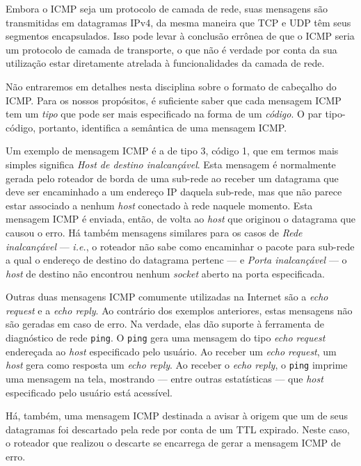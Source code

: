 \documentclass{article}
\begin{document}
Embora o ICMP seja um protocolo de camada de rede, suas mensagens são transmitidas em datagramas IPv4, da mesma maneira que TCP e UDP têm seus segmentos encapsulados. Isso pode levar à conclusão errônea de que o ICMP seria um protocolo de camada de transporte, o que não é verdade por conta da sua utilização estar diretamente atrelada à funcionalidades da camada de rede.

Não entraremos em detalhes nesta disciplina sobre o formato de cabeçalho do ICMP. Para os nossos propósitos, é suficiente saber que cada mensagem ICMP tem um \textit{tipo} que pode ser mais especificado na forma de um \textit{código}. O par tipo-código, portanto, identifica a semântica de uma mensagem ICMP.

Um exemplo de mensagem ICMP é a de tipo 3, código 1, que em termos mais simples significa \textit{Host de destino inalcançável}. Esta mensagem é normalmente gerada pelo roteador de borda de uma sub-rede ao receber um datagrama que deve ser encaminhado a um endereço IP daquela sub-rede, mas que não parece estar associado a nenhum \textit{host} conectado à rede naquele momento. Esta mensagem ICMP é enviada, então, de volta ao \textit{host} que originou o datagrama que causou o erro. Há também mensagens similares para os casos de \textit{Rede inalcançável} --- \textit{i.e.}, o roteador não sabe como encaminhar o pacote para sub-rede a qual o endereço de destino do datagrama pertenc --- e \textit{Porta inalcançável} --- o \textit{host} de destino não encontrou nenhum \textit{socket} aberto na porta especificada.

Outras duas mensagens ICMP comumente utilizadas na Internet são a \textit{echo request} e a \textit{echo reply}. Ao contrário dos exemplos anteriores, estas mensagens não são geradas em caso de erro. Na verdade, elas dão suporte à ferramenta de diagnóstico de rede \texttt{ping}. O \texttt{ping} gera uma mensagem do tipo \textit{echo request} endereçada ao \textit{host} especificado pelo usuário. Ao receber um \textit{echo request}, um \textit{host} gera como resposta um \textit{echo reply}. Ao receber o \textit{echo reply}, o \texttt{ping} imprime uma mensagem na tela, mostrando --- entre outras estatísticas --- que \textit{host} especificado pelo usuário está acessível.

Há, também, uma mensagem ICMP destinada a avisar à origem que um de seus datagramas foi descartado pela rede por conta de um TTL expirado. Neste caso, o roteador que realizou o descarte se encarrega de gerar a mensagem ICMP de erro.
\end{document}
